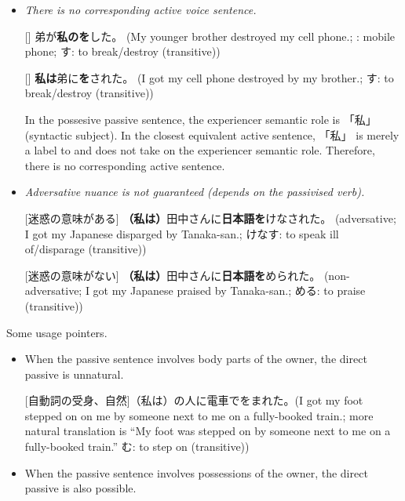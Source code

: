 \documentclass[../nihongo-gakushuu-kyouzai.tex]{subfiles}
\begin{document}
\begin{enumerate}[label=\arabic*.]
    \begin{itemize}
        \item \emph{There is no corresponding active voice sentence.}

        [] 弟が\textbf{私のを}した。 (My younger brother destroyed my cell phone.; : mobile phone; す: to break/destroy (transitive))

        [] \textbf{私は}弟に\textbf{を}された。 (I got my cell phone destroyed by my brother.; す: to break/destroy (transitive))

        In the possesive passive sentence, the experiencer semantic role is 「私」 (syntactic subject). In the closest equivalent active sentence, 「私」 is merely a label to  and does not take on the experiencer semantic role. Therefore, there is no corresponding active sentence.

        \item \emph{Adversative nuance is not guaranteed (depends on the passivised verb).}

        [迷惑の意味がある] \textbf{（私は）}田中さんに\textbf{日本語を}けなされた。 (adversative; I got my Japanese disparged by Tanaka-san.; けなす: to speak ill of/disparage (transitive))

        [迷惑の意味がない] \textbf{（私は）}田中さんに\textbf{日本語を}められた。 (non-adversative; I got my Japanese praised by Tanaka-san.; める: to praise (transitive))
    \end{itemize}

    Some usage pointers.

    \begin{itemize}
        \item When the passive sentence involves body parts of the owner, the direct passive is unnatural.

        [自動詞の受身、自然]（私は）の人に電車でをまれた。(I got my foot stepped on on me by someone next to me on a fully-booked train.; more natural translation is ``My foot was stepped on by someone next to me on a fully-booked train.'' む: to step on (transitive))


        \item When the passive sentence involves possessions of the owner, the direct passive is also possible.


\end{itemize}
\end{enumerate}
\end{document}
